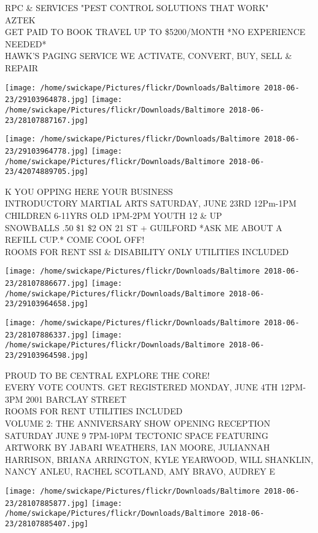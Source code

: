 \documentclass[10pt,letterpaper]{article}
\begin{document}
RPC \& SERVICES "PEST CONTROL SOLUTIONS THAT WORK"\\
AZTEK\\
GET PAID TO BOOK TRAVEL UP TO \$5200/MONTH *NO EXPERIENCE NEEDED*\\
HAWK'S PAGING SERVICE WE ACTIVATE, CONVERT, BUY, SELL \& REPAIR
\pagebreak

\texttt{[image: /home/swickape/Pictures/flickr/Downloads/Baltimore 2018-06-23/29103964878.jpg]}
\texttt{[image: /home/swickape/Pictures/flickr/Downloads/Baltimore 2018-06-23/28107887167.jpg]}

\texttt{[image: /home/swickape/Pictures/flickr/Downloads/Baltimore 2018-06-23/29103964778.jpg]}
\texttt{[image: /home/swickape/Pictures/flickr/Downloads/Baltimore 2018-06-23/42074889705.jpg]}

K YOU OPPING HERE YOUR BUSINESS\\
INTRODUCTORY MARTIAL ARTS SATURDAY, JUNE 23RD 12Pm{-}1PM CHILDREN 6{-}11YRS OLD 1PM{-}2PM YOUTH 12 \& UP\\
SNOWBALLS .50 \$1 \$2 ON 21 ST + GUILFORD *ASK ME ABOUT A REFILL CUP.* COME COOL OFF!\\
ROOMS FOR RENT SSI \& DISABILITY ONLY UTILITIES INCLUDED
\pagebreak

\texttt{[image: /home/swickape/Pictures/flickr/Downloads/Baltimore 2018-06-23/28107886677.jpg]}
\texttt{[image: /home/swickape/Pictures/flickr/Downloads/Baltimore 2018-06-23/29103964658.jpg]}

\texttt{[image: /home/swickape/Pictures/flickr/Downloads/Baltimore 2018-06-23/28107886337.jpg]}
\texttt{[image: /home/swickape/Pictures/flickr/Downloads/Baltimore 2018-06-23/29103964598.jpg]}

PROUD TO BE CENTRAL EXPLORE THE CORE!\\
EVERY VOTE COUNTS.  GET REGISTERED MONDAY, JUNE 4TH 12PM{-}3PM 2001 BARCLAY STREET\\
ROOMS FOR RENT  UTILITIES INCLUDED\\
VOLUME 2: THE ANNIVERSARY SHOW OPENING RECEPTION SATURDAY JUNE 9 7PM{-}10PM TECTONIC SPACE FEATURING ARTWORK BY JABARI WEATHERS, IAN MOORE, JULIANNAH HARRISON, BRIANA ARRINGTON, KYLE YEARWOOD, WILL SHANKLIN, NANCY ANLEU, RACHEL SCOTLAND, AMY BRAVO, AUDREY E
\pagebreak

\texttt{[image: /home/swickape/Pictures/flickr/Downloads/Baltimore 2018-06-23/28107885877.jpg]}
\texttt{[image: /home/swickape/Pictures/flickr/Downloads/Baltimore 2018-06-23/28107885407.jpg]}
\end{document}
